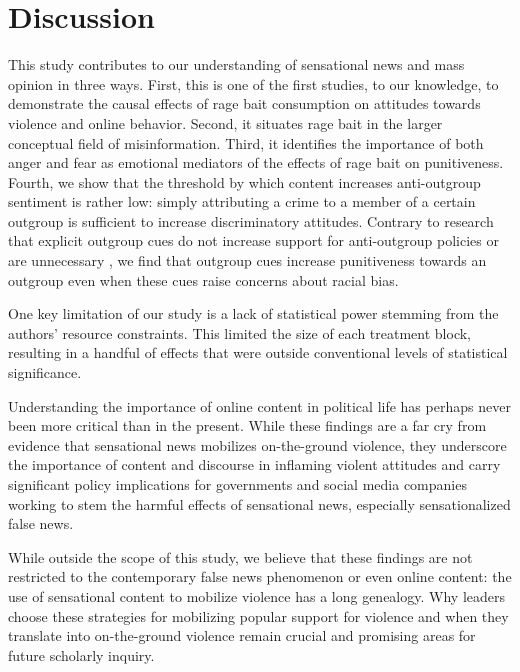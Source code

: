 \section{Discussion}

This study contributes to our understanding of sensational news and mass opinion in three ways. First, this is one of the first studies, to our knowledge, to demonstrate the causal effects of rage bait consumption on attitudes towards violence and online behavior. Second, it situates rage bait in the larger conceptual field of misinformation. Third, it identifies the importance of both anger and fear as emotional mediators of the effects of rage bait on punitiveness. Fourth, we show that the threshold by which content increases anti-outgroup sentiment is rather low: simply attributing a crime to a member of a certain outgroup is sufficient to increase discriminatory attitudes. Contrary to research that explicit outgroup cues do not increase support for anti-outgroup policies \citep{huber2006race,mendelberg2001race} or are unnecessary \citep{banks2016group}, we find that outgroup cues increase punitiveness towards an outgroup even when these cues raise concerns about racial bias.

One key limitation of our study is a lack of statistical power stemming from the authors' resource constraints. This limited the size of each treatment block, resulting in a handful of effects that were outside conventional levels of statistical significance.

Understanding the importance of online content in political life has perhaps never been more critical than in the present. While these findings are a far cry from evidence that sensational news mobilizes on-the-ground violence, they underscore the importance of content and discourse in inflaming violent attitudes and carry significant policy implications for governments and social media companies working to stem the harmful effects of sensational news, especially sensationalized false news. 

While outside the scope of this study, we believe that these findings are not restricted to the contemporary false news phenomenon or even online content: the use of sensational content to mobilize violence has a long genealogy. Why leaders choose these strategies for mobilizing popular support for violence and when they translate into on-the-ground violence remain crucial and promising areas for future scholarly inquiry.

